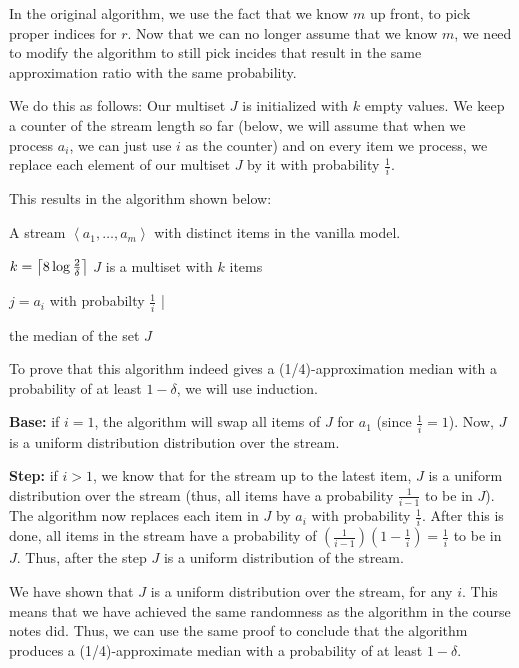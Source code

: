 In the original algorithm, we use the fact that we know $m$ up front, to pick proper indices for $r$.
Now that we can no longer assume that we know $m$, we need to modify the algorithm to still pick incides that result in the same approximation ratio with the same probability.

We do this as follows:
Our multiset $J$ is initialized with $k$ empty values.
We keep a counter of the stream length so far (below, we will assume that when we process $a_i$, we can just use $i$ as the counter) and on every item we process, we replace each element of our multiset $J$ by it with probability $\frac{1}{i}$.

This results in the algorithm shown below:
\begin{sourcecode}
A stream $\left<a_1, \ldots, a_m\right>$ with distinct items in the vanilla model.
\silend

$k = \ceil*{8 \log{\frac{2}{\delta}}}$
$J$ is a multiset with $k$ items
\silend

	$j = a_i$ with probabilty $\frac{1}{i}$
|
\silend

\return the median of the set $J$
\qend
\end{sourcecode}

To prove that this algorithm indeed gives a (1/4)-approximation median with a probability of at least $1-\delta$, we will use induction.

\textbf{Base:} if $i = 1$, the algorithm will swap all items of $J$ for $a_1$ (since $\frac{1}{i} = 1$). Now, $J$ is a uniform distribution distribution over the stream.

\textbf{Step:} if $i > 1$, we know that for the stream up to the latest item, $J$ is a uniform distribution over the stream (thus, all items have a probability $\frac{1}{i-1}$ to be in $J$).
The algorithm now replaces each item in $J$ by $a_i$ with probability $\frac{1}{i}$.
After this is done, all items in the stream have a probability of $(\frac{1}{i-1}) (1-\frac{1}{i}) = \frac{1}{i}$ to be in $J$.
Thus, after the step $J$ is a uniform distribution of the stream.

We have shown that $J$ is a uniform distribution over the stream, for any $i$.
This means that we have achieved the same randomness as the algorithm in the course notes did.
Thus, we can use the same proof to conclude that the algorithm produces a (1/4)-approximate median with a probability of at least $1 - \delta$.
